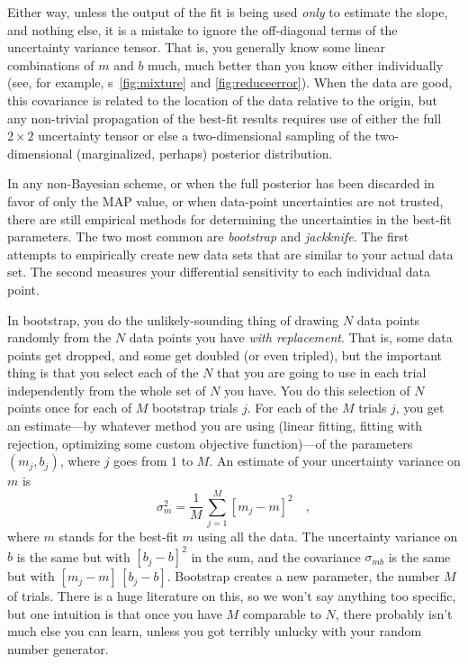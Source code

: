 \documentclass[12pt,twoside]{article}
\newcommand{\figurenames}{\figurename s}
\begin{document}
Either way, unless the output of the fit is being used \emph{only} to
estimate the slope, and nothing else, it is a mistake to ignore the
off-diagonal terms of the uncertainty variance tensor.  That is, you
generally know some linear combinations of $m$ and $b$ much, much
better than you know either individually (see, for example,
\figurenames~\ref{fig:mixture} and \ref{fig:reduceerror}).  When the
data are good, this covariance is related to the location of the data
relative to the origin, but any non-trivial propagation of the
best-fit results requires use of either the full $2\times 2$
uncertainty tensor or else a two-dimensional sampling of the
two-dimensional (marginalized, perhaps) posterior distribution.

In any non-Bayesian scheme, or when the full posterior has been
discarded in favor of only the MAP value, or when data-point
uncertainties are not trusted, there are still empirical methods for
determining the uncertainties in the best-fit parameters.  The two
most common are \emph{bootstrap} and \emph{jackknife}.  The first
attempts to empirically create new data sets that are similar to your
actual data set.  The second measures your differential sensitivity to
each individual data point.

In bootstrap, you do the unlikely-sounding thing of drawing $N$ data
points randomly from the $N$ data points you have \emph{with
  replacement}.  That is, some data points get dropped, and some get
doubled (or even tripled), but the important thing is that you select
each of the $N$ that you are going to use in each trial independently
from the whole set of $N$ you have.  You do this selection of $N$
points once for each of $M$ bootstrap trials $j$.  For each of the $M$
trials $j$, you get an estimate---by whatever method you are using
(linear fitting, fitting with rejection, optimizing some custom
objective function)---of the parameters $(m_j,b_j)$, where $j$ goes
from $1$ to $M$.  An estimate of your uncertainty variance on $m$ is
\begin{equation}
\sigma_m^2 = \frac{1}{M}\,\sum_{j=1}^M [m_j-m]^2 \quad ,
\end{equation}
where $m$ stands for the best-fit $m$ using all the data.  The
uncertainty variance on $b$ is the same but with $[b_j-b]^2$ in the
sum, and the covariance $\sigma_{mb}$ is the same but with
$[m_j-m]\,[b_j-b]$.   Bootstrap
creates a new parameter, the number $M$ of trials.  There is a huge
literature on this, so we won't say anything too specific, but one
intuition is that once you have $M$ comparable to $N$, there probably
isn't much else you can learn, unless you got terribly unlucky with
your random number generator.
\end{document}
